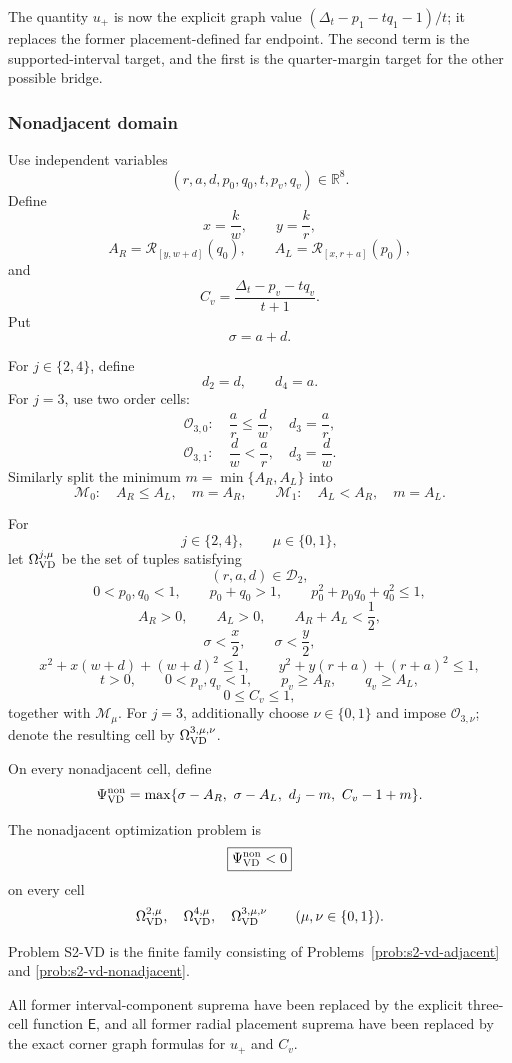The quantity \(u_+\) is now the explicit graph value
\((\Delta_t-p_1-tq_1-1)/t\); it replaces the former placement-defined far
endpoint.  The second term is the supported-interval target, and the first is
the quarter-margin target for the other possible bridge.

\subsubsection{Nonadjacent domain}

Use independent variables
\[
 (r,a,d,p_0,q_0,t,p_v,q_v)\in\mathbb R^8.
\]
Define
\[
 x=\frac{k}{w},\qquad y=\frac{k}{r},
\]
\[
 A_R=\mathcal R_{[y,w+d]}(q_0),
 \qquad
 A_L=\mathcal R_{[x,r+a]}(p_0),
\]
and
\[
 C_v=\frac{\Delta_t-p_v-tq_v}{t+1}.
\]
Put
\[
 \sigma=a+d.
\]

For \(j\in\{2,4\}\), define
\[
 d_2=d,\qquad d_4=a.
\]
For \(j=3\), use two order cells:
\[
 \mathcal O_{3,0}:\quad \frac ar\le\frac dw,\quad d_3=\frac ar,
\]
\[
 \mathcal O_{3,1}:\quad \frac dw<\frac ar,\quad d_3=\frac dw.
\]
Similarly split the minimum \(m=\min\{A_R,A_L\}\) into
\[
 \mathcal M_0:\quad A_R\le A_L,\quad m=A_R,
 \qquad
 \mathcal M_1:\quad A_L<A_R,\quad m=A_L.
\]

\begin{definition}
\label{def:s2-vd-nonadjacent-domain}
For
\[
 j\in\{2,4\},\qquad \mu\in\{0,1\},
\]
let \(\Omega_{\rm VD}^{j,\mu}\) be the set of tuples satisfying
\[
 (r,a,d)\in\mathcal D_2,
\]
\[
 0<p_0,q_0<1,\qquad
 p_0+q_0>1,\qquad
 p_0^2+p_0q_0+q_0^2\le1,
\]
\[
 A_R>0,\qquad A_L>0,\qquad A_R+A_L<\frac12,
\]
\[
 \sigma<\frac x2,\qquad \sigma<\frac y2,
\]
\[
 x^2+x(w+d)+(w+d)^2\le1,\qquad
 y^2+y(r+a)+(r+a)^2\le1,
\]
\[
 t>0,\qquad
 0<p_v,q_v<1,\qquad
 p_v\ge A_R,\qquad q_v\ge A_L,
\]
\[
 0\le C_v\le1,
\]
together with \(\mathcal M_\mu\).  For \(j=3\), additionally choose
\(\nu\in\{0,1\}\) and impose \(\mathcal O_{3,\nu}\); denote the resulting
cell by \(\Omega_{\rm VD}^{3,\mu,\nu}\).
\end{definition}

On every nonadjacent cell, define
\[
 \Psi_{\rm VD}^{\rm non}
 =\max\{\sigma-A_R,\ \sigma-A_L,\ d_j-m,\ C_v-1+m\}.
\]

\begin{definition}
\label{prob:s2-vd-nonadjacent}
The nonadjacent optimization problem is
\[
 \boxed{
 \Psi_{\rm VD}^{\rm non}<0
 }
\]
on every cell
\[
 \Omega_{\rm VD}^{2,\mu},\quad
 \Omega_{\rm VD}^{4,\mu},\quad
 \Omega_{\rm VD}^{3,\mu,\nu}
 \qquad(\mu,\nu\in\{0,1\}).
\]
\end{definition}

\begin{definition}[Problem S2-VD]
\label{prob:s2-vd-terminal}
Problem S2-VD is the finite family consisting of
Problems~\ref{prob:s2-vd-adjacent} and
\ref{prob:s2-vd-nonadjacent}.
\end{definition}

All former interval-component suprema have been replaced by the explicit
three-cell function \(\mathsf E\), and all former radial placement suprema
have been replaced by the exact corner graph formulas for \(u_+\) and \(C_v\).
